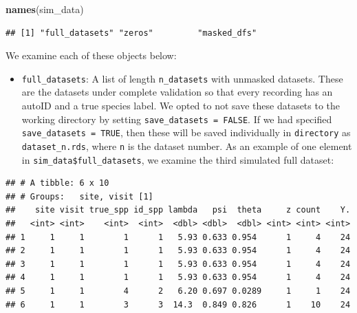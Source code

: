 \documentclass[
]{article}
\newenvironment{Shaded}{\begin{snugshade}}{\end{snugshade}}
\newcommand{\CommentTok}[1]{\textcolor[rgb]{0.56,0.35,0.01}{\textit{#1}}}
\newcommand{\DecValTok}[1]{\textcolor[rgb]{0.00,0.00,0.81}{#1}}
\newcommand{\FunctionTok}[1]{\textcolor[rgb]{0.13,0.29,0.53}{\textbf{#1}}}
\newcommand{\NormalTok}[1]{#1}
\newcommand{\OtherTok}[1]{\textcolor[rgb]{0.56,0.35,0.01}{#1}}
\newcommand{\SpecialCharTok}[1]{\textcolor[rgb]{0.81,0.36,0.00}{\textbf{#1}}}
\providecommand{\tightlist}{%
  \setlength{\itemsep}{0pt}\setlength{\parskip}{0pt}}
\begin{document}
\linespread{1}

\begin{Shaded}
\begin{Highlighting}[]
\FunctionTok{names}\NormalTok{(sim\_data)}
\end{Highlighting}
\end{Shaded}

\begin{verbatim}
## [1] "full_datasets" "zeros"         "masked_dfs"
\end{verbatim}

\linespread{1}

We examine each of these objects below:

\begin{itemize}
\tightlist
\item
  \texttt{full\_datasets}: A list of length \texttt{n\_datasets} with unmasked datasets. These are the datasets under complete validation so that every recording has an autoID and a true species label. We opted to not save these datasets to the working directory by setting \texttt{save\_datasets\ =\ FALSE}. If we had specified \texttt{save\_datasets\ =\ TRUE}, then these will be saved individually in \texttt{directory} as \texttt{dataset\_n.rds}, where \texttt{n} is the dataset number. As an example of one element in \texttt{sim\_data\$full\_datasets}, we examine the third simulated full dataset:
\end{itemize}

\linespread{1}

\begin{Shaded}
\end{Shaded}

\begin{verbatim}
## # A tibble: 6 x 10
## # Groups:   site, visit [1]
##    site visit true_spp id_spp lambda   psi  theta     z count    Y.
##   <int> <int>    <int>  <int>  <dbl> <dbl>  <dbl> <int> <int> <int>
## 1     1     1        1      1   5.93 0.633 0.954      1     4    24
## 2     1     1        1      1   5.93 0.633 0.954      1     4    24
## 3     1     1        1      1   5.93 0.633 0.954      1     4    24
## 4     1     1        1      1   5.93 0.633 0.954      1     4    24
## 5     1     1        4      2   6.20 0.697 0.0289     1     1    24
## 6     1     1        3      3  14.3  0.849 0.826      1    10    24
\end{verbatim}
\end{document}
